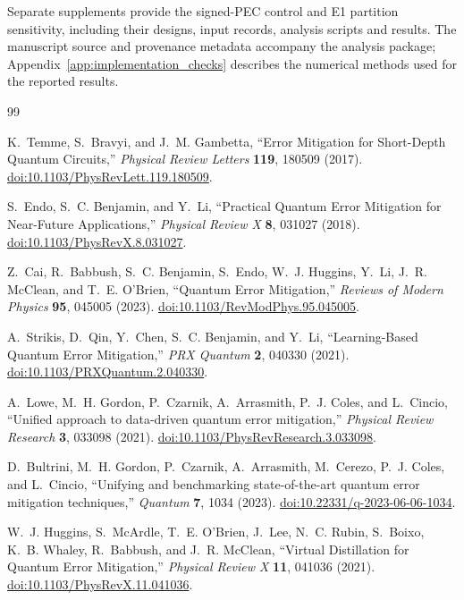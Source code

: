 \documentclass[a4paper,onecolumn,unpublished,nopdfoutputerror]{quantumarticle}
\theoremstyle{plain}
\theoremstyle{definition}
\newcommand{\1}{\mathbf{1}}
\begin{document}
Separate supplements provide the signed-PEC control and E1 partition sensitivity, including their designs, input records, analysis scripts and results. The manuscript source and provenance metadata accompany the analysis package; Appendix~\ref{app:implementation_checks} describes the numerical methods used for the reported results.

\begin{thebibliography}{99}

K.~Temme, S.~Bravyi, and J.~M. Gambetta,
``Error Mitigation for Short-Depth Quantum Circuits,''
\emph{Physical Review Letters} \textbf{119}, 180509 (2017). \href{https://doi.org/10.1103/PhysRevLett.119.180509}{doi:10.1103/PhysRevLett.119.180509}.

S.~Endo, S.~C. Benjamin, and Y.~Li,
``Practical Quantum Error Mitigation for Near-Future Applications,''
\emph{Physical Review X} \textbf{8}, 031027 (2018). \href{https://doi.org/10.1103/PhysRevX.8.031027}{doi:10.1103/PhysRevX.8.031027}.

Z.~Cai, R.~Babbush, S.~C. Benjamin, S.~Endo, W.~J. Huggins, Y.~Li, J.~R. McClean, and T.~E. O'Brien,
``Quantum Error Mitigation,''
\emph{Reviews of Modern Physics} \textbf{95}, 045005 (2023). \href{https://doi.org/10.1103/RevModPhys.95.045005}{doi:10.1103/RevModPhys.95.045005}.

A.~Strikis, D.~Qin, Y.~Chen, S.~C. Benjamin, and Y.~Li,
``Learning-Based Quantum Error Mitigation,''
\emph{PRX Quantum} \textbf{2}, 040330 (2021). \href{https://doi.org/10.1103/PRXQuantum.2.040330}{doi:10.1103/PRXQuantum.2.040330}.

A.~Lowe, M.~H. Gordon, P.~Czarnik, A.~Arrasmith, P.~J. Coles, and L.~Cincio,
``Unified approach to data-driven quantum error mitigation,''
\emph{Physical Review Research} \textbf{3}, 033098 (2021). \href{https://doi.org/10.1103/PhysRevResearch.3.033098}{doi:10.1103/PhysRevResearch.3.033098}.

D.~Bultrini, M.~H. Gordon, P.~Czarnik, A.~Arrasmith, M.~Cerezo, P.~J. Coles, and L.~Cincio,
``Unifying and benchmarking state-of-the-art quantum error mitigation techniques,''
\emph{Quantum} \textbf{7}, 1034 (2023). \href{https://doi.org/10.22331/q-2023-06-06-1034}{doi:10.22331/q-2023-06-06-1034}.

W.~J. Huggins, S.~McArdle, T.~E. O'Brien, J.~Lee, N.~C. Rubin, S.~Boixo, K.~B. Whaley, R.~Babbush, and J.~R. McClean,
``Virtual Distillation for Quantum Error Mitigation,''
\emph{Physical Review X} \textbf{11}, 041036 (2021). \href{https://doi.org/10.1103/PhysRevX.11.041036}{doi:10.1103/PhysRevX.11.041036}.


\end{thebibliography}
\end{document}
